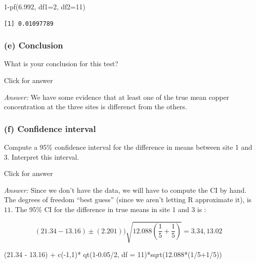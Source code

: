 \documentclass[
]{book}
\newenvironment{Shaded}{\begin{snugshade}}{\end{snugshade}}
\newcommand{\AttributeTok}[1]{\textcolor[rgb]{0.77,0.63,0.00}{#1}}
\newcommand{\DecValTok}[1]{\textcolor[rgb]{0.00,0.00,0.81}{#1}}
\newcommand{\FloatTok}[1]{\textcolor[rgb]{0.00,0.00,0.81}{#1}}
\newcommand{\FunctionTok}[1]{\textcolor[rgb]{0.00,0.00,0.00}{#1}}
\newcommand{\NormalTok}[1]{#1}
\newcommand{\SpecialCharTok}[1]{\textcolor[rgb]{0.00,0.00,0.00}{#1}}
\begin{document}
\begin{Shaded}
\begin{Highlighting}[]
\DecValTok{1}\SpecialCharTok{{-}}\FunctionTok{pf}\NormalTok{(}\FloatTok{6.992}\NormalTok{, }\AttributeTok{df1=}\DecValTok{2}\NormalTok{, }\AttributeTok{df2=}\DecValTok{11}\NormalTok{)}
\end{Highlighting}
\end{Shaded}

\begin{verbatim}
[1] 0.01097789
\end{verbatim}

\hypertarget{e-conclusion}{%
\subsubsection{(e) Conclusion}\label{e-conclusion}}

What is your conclusion for this test?

Click for answer

\emph{Answer:} We have some evidence that at least one of the true mean copper concentration at the three sites is differenct from the others.

\hypertarget{f-confidence-interval}{%
\subsubsection{(f) Confidence interval}\label{f-confidence-interval}}

Compute a 95\% confidence interval for the difference in means between site 1 and 3. Interpret this interval.

Click for answer

\emph{Answer:} Since we don't have the data, we will have to compute the CI by hand. The degrees of freedom ``best guess'' (since we aren't letting R approximate it), is \(11\). The 95\% CI for the difference in true means in site 1 and 3 is :

\[
(21.34 - 13.16)  \pm (2.201)) \sqrt{12.088\left(\dfrac{1}{5} + \dfrac{1}{5}\right)} = 3.34, 13.02
\]

\begin{Shaded}
\begin{Highlighting}[]
\NormalTok{(}\FloatTok{21.34} \SpecialCharTok{{-}} \FloatTok{13.16}\NormalTok{) }\SpecialCharTok{+} \FunctionTok{c}\NormalTok{(}\SpecialCharTok{{-}}\DecValTok{1}\NormalTok{,}\DecValTok{1}\NormalTok{)}\SpecialCharTok{*} \FunctionTok{qt}\NormalTok{(}\DecValTok{1}\FloatTok{{-}0.05}\SpecialCharTok{/}\DecValTok{2}\NormalTok{, }\AttributeTok{df =} \DecValTok{11}\NormalTok{)}\SpecialCharTok{*}\FunctionTok{sqrt}\NormalTok{(}\FloatTok{12.088}\SpecialCharTok{*}\NormalTok{(}\DecValTok{1}\SpecialCharTok{/}\DecValTok{5}\SpecialCharTok{+}\DecValTok{1}\SpecialCharTok{/}\DecValTok{5}\NormalTok{))}
\end{Highlighting}
\end{Shaded}
\end{document}
